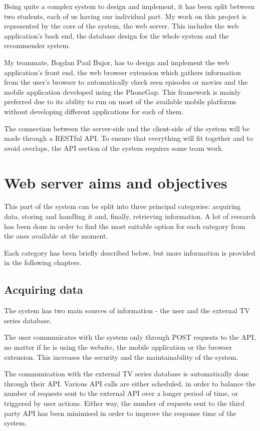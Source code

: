 Being quite a complex system to design and implement, it has been split between two students, each of us having our individual part. My work on this project is represented by the core of the system, the web server. This includes the web application's back end, the database design for the whole system and the recommender system.

My teammate, Bogdan Paul Bujor, has to design and implement the web application's front end, the web browser extension which gathers information from the user's browser to automatically check seen episodes or movies and the mobile application developed using the PhoneGap. This framework is mainly preferred due to its ability to run on most of the available mobile platforms without developing different applications for each of them.

The connection between the server-side and the client-side of the system will be made through a RESTful API. To ensure that everything will fit together and to avoid overlaps, the API section of the system requires some team work.

\section{Web server aims and objectives}

This part of the system can be split into three principal categories: acquiring data, storing and handling it and, finally, retrieving information. A lot of research has been done in order to find the most suitable option for each category from the ones available at the moment.

Each category has been briefly described below, but more information is provided in the following chapters.

\subsection{Acquiring data}

The system has two main sources of information - the user and the external TV series database.

The user communicates with the system only through POST requests to the API, no matter if he is using the website, the mobile application or the browser extension. This increases the security and the maintainability of the system.

The communication with the external TV series database is automatically done through their API. Various API calls are either scheduled, in order to balance the number of requests sent to the external API over a longer period of time, or triggered by user actions. Either way, the number of requests sent to the third party API has been minimised in order to improve the response time of the system.

